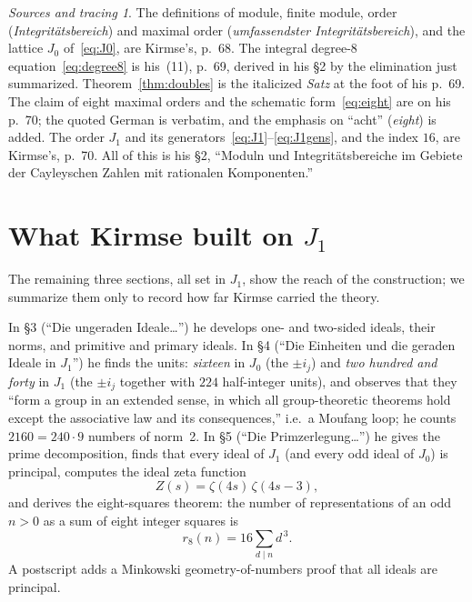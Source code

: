 \documentclass[11pt]{amsart}
\numberwithin{equation}{section}
\theoremstyle{definition}
\theoremstyle{plain}
\theoremstyle{remark}
\newtheorem*{tracing}{Sources and tracing}
\begin{document}
\begin{tracing}
The definitions of module, finite module, order (\emph{Integrit\"atsbereich})
and maximal order (\emph{umfassendster Integrit\"atsbereich}), and the
lattice $J_0$ of~\eqref{eq:J0}, are Kirmse's, \cite{Kirmse1924} p.~68.  The
integral degree-8 equation~\eqref{eq:degree8} is his~(11), p.~69, derived in
his \S2 by the elimination just summarized.  Theorem~\ref{thm:doubles} is the
italicized \emph{Satz} at the foot of his p.~69.  The claim of eight maximal
orders and the schematic form~\eqref{eq:eight} are on his p.~70; the quoted
German is verbatim, and the emphasis on ``acht'' (\emph{eight}) is added.
The order $J_1$ and its generators~\eqref{eq:J1}--\eqref{eq:J1gens}, and the
index $16$, are Kirmse's, p.~70.  All of this is his \S2, ``Moduln und
Integrit\"atsbereiche im Gebiete der Cayleyschen Zahlen mit rationalen
Komponenten.''
\end{tracing}

\section{What Kirmse built on $J_1$}\label{sec:after}

The remaining three sections, all set in $J_1$, show the reach of the
construction; we summarize them only to record how far Kirmse carried the
theory.

In \S3 (``Die ungeraden Ideale\ldots'') he develops one- and two-sided ideals,
their norms, and primitive and primary ideals.  In \S4 (``Die Einheiten und
die geraden Ideale in $J_1$'') he finds the units: \emph{sixteen} in $J_0$
(the $\pm i_j$) and \emph{two hundred and forty} in $J_1$
(the $\pm i_j$ together with $224$ half-integer units), and observes that
they ``form a group in an extended sense, in which all group-theoretic
theorems hold except the associative law and its consequences,'' i.e.\ a
Moufang loop; he counts $2160 = 240\cdot 9$ numbers of norm~2.  In \S5 (``Die
Primzerlegung\ldots'') he gives the prime decomposition, finds that every
ideal of $J_1$ (and every odd ideal of $J_0$) is principal, computes the
ideal zeta function
\begin{equation}\label{eq:zeta}
  Z(s) = \zeta(4s)\,\zeta(4s-3),
\end{equation}
and derives the eight-squares theorem: the number of representations of an
odd $n>0$ as a sum of eight integer squares is
\begin{equation}\label{eq:eightsquares}
  r_8(n) = 16\sum_{d\mid n} d^{\,3}.
\end{equation}
A postscript adds a Minkowski geometry-of-numbers proof that all ideals are
principal.
\end{document}

